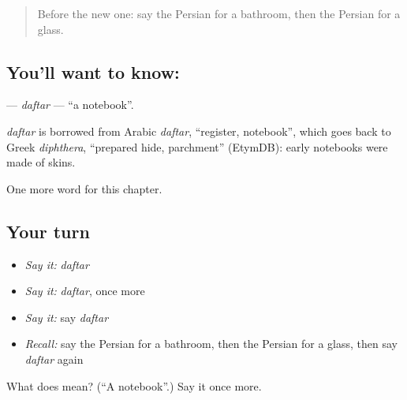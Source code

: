 \label{lesson:FA-C48-daftar}



\begin{quote}
Before the new one: say the Persian for a bathroom, then the Persian for a glass.
\end{quote}

\subsection*{You'll want to know: }
\textbf{} — \emph{daftar} — \textquotedblleft{}a notebook\textquotedblright{}.

\begin{cousinweb}
\emph{daftar} is borrowed from Arabic \emph{daftar}, \textquotedblleft{}register, notebook\textquotedblright{}, which goes back to Greek \emph{diphthera}, \textquotedblleft{}prepared hide, parchment\textquotedblright{} (EtymDB): early notebooks were made of skins.
\end{cousinweb}

\begin{grammarlens}[title={What you've built}]
One more word for this chapter.
\end{grammarlens}

\subsection*{Your turn}
\begin{itemize}
\raggedright
  \item \emph{Say it:} \emph{daftar}
  \item \emph{Say it:} \emph{daftar}, once more
  \item \emph{Say it:} say \emph{daftar}
  \item \emph{Recall:} say the Persian for a bathroom, then the Persian for a glass, then say \emph{daftar} again
\end{itemize}

\begin{tcolorbox}[breakable,colback=teal!4,colframe=teal!35!black,title={Before you move on}]
What does  mean? (\textquotedblleft{}A notebook\textquotedblright{}.) Say it once more.
\end{tcolorbox}
